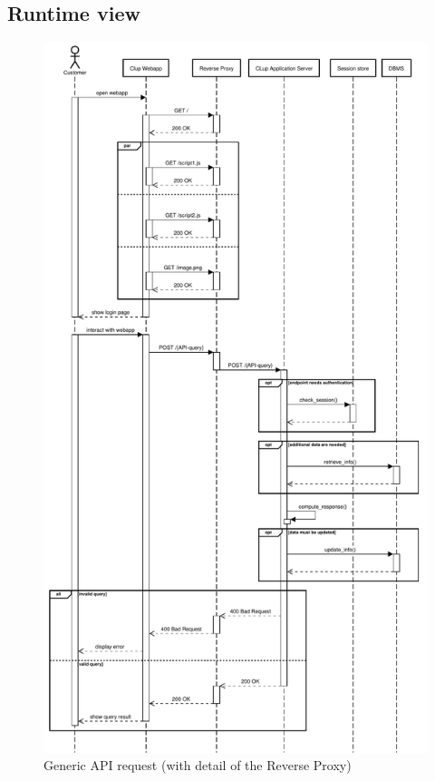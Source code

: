 \subsection{Runtime view}
\begin{figure}[H]
    \centering
    \includegraphics[height=0.9\textheight]{Images/runtime_revproxy.pdf}
    \caption{Generic API request (with detail of the Reverse Proxy)}
\end{figure}
